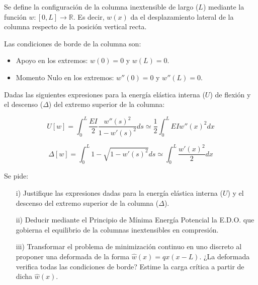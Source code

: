 \bigskip
\begin{exercise}
	
	Se define la configuración de la columna inextensible de largo ($L$) mediante la función $w:[0,L]\rightarrow \mathbb{R}$. Es decir, $w(x)$ da el desplazamiento lateral de la columna respecto de la posición vertical recta.
	
	Las condiciones de borde de la columna son:
	
	\begin{itemize}
		\item Apoyo en los extremos: $w(0)=0$ y $w(L)=0$.
		\item Momento Nulo en los extremos: $w''(0)=0$ y $w''(L)=0$.
	\end{itemize}
	
	Dadas las siguientes expresiones para la energía elástica interna ($U$) de flexión y el descenso ($\Delta$) del extremo superior de la columna:
	
	\begin{equation}
		U[w] = \int_{0}^{L} \frac{EI}{2}\frac{{w''(s)}^2}{1-w'(s)^2} ds \simeq \frac{1}{2}\int_{0}^{L} EI{w''(x)}^2 dx
	\end{equation}
	
	\begin{equation}
		\Delta[w] = \int_{0}^{L} 1-\sqrt{1-w'(s)^2} ds \simeq \int_{0}^{L} \frac{w'(x)^2}{2} dx
	\end{equation}
	
	Se pide:
	
	\begin{enumerate}
		\item[i)] Justifique las expresiones dadas para la energía elástica interna ($U$) y el descenso del extremo superior de la columna ($\Delta$).
		
		\item[ii)] Deducir mediante el Principio de Mínima Energía Potencial la E.D.O. que gobierna el equilibrio de la columnas inextensibles en compresión.
		
		\item[iii)] Transformar el problema de minimización continuo en uno discreto al proponer una deformada de la forma $\hat{w}(x)=qx(x-L)$. ¿La deformada verifica todas las condiciones de borde? Estime la carga crítica a partir de dicha $\hat{w}(x)$.
	\end{enumerate}
	
	
\end{exercise}



